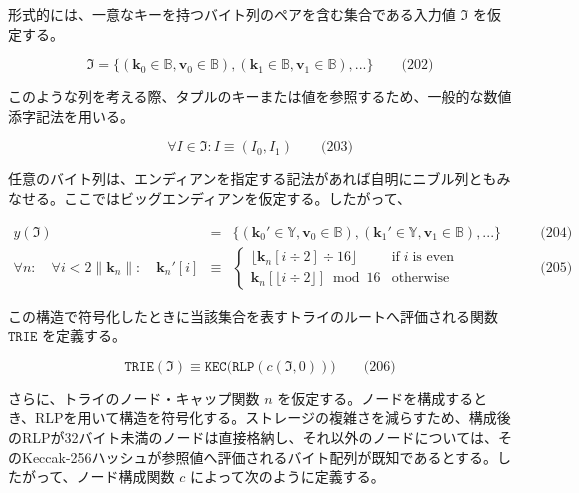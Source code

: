\documentclass[
]{ltjsarticle}
\begin{document}
形式的には、一意なキーを持つバイト列のペアを含む集合である入力値
\(\mathfrak{I}\) を仮定する。

\protect\hypertarget{eq-202}{}{}

\[\mathfrak{I} = \{ (\mathbf{k}_0 \in \mathbb{B}, \mathbf{v}_0 \in \mathbb{B}), (\mathbf{k}_1 \in \mathbb{B}, \mathbf{v}_1 \in \mathbb{B}), ... \} \qquad \text{(202)}\]

このような列を考える際、タプルのキーまたは値を参照するため、一般的な数値添字記法を用いる。

\protect\hypertarget{eq-203}{}{}

\[\forall I \in \mathfrak{I}: I \equiv (I_0, I_1) \qquad \text{(203)}\]

任意のバイト列は、エンディアンを指定する記法があれば自明にニブル列ともみなせる。ここではビッグエンディアンを仮定する。したがって、

\protect\hypertarget{eq-204}{}{}\protect\hypertarget{eq-205}{}{}

\[\begin{aligned}
y(\mathfrak{I}) & = & \{ (\mathbf{k}_0' \in \mathbb{Y}, \mathbf{v}_0 \in \mathbb{B}), (\mathbf{k}_1' \in \mathbb{Y}, \mathbf{v}_1 \in \mathbb{B}), ... \} & \qquad \text{(204)} \\
\forall n: \quad \forall i < 2\lVert\mathbf{k}_{n}\rVert: \quad \mathbf{k}_{n}'[i] & \equiv &
\begin{cases}
\lfloor \mathbf{k}_{n}[i \div 2] \div 16 \rfloor & \text{if} \; i \; \text{is even} \\
\mathbf{k}_{n}[\lfloor i \div 2 \rfloor] \bmod 16 & \text{otherwise}
\end{cases} & \qquad \text{(205)}
\end{aligned}\]

この構造で符号化したときに当該集合を表すトライのルートへ評価される関数
\(\texttt{TRIE}\) を定義する。

\protect\hypertarget{eq-206}{}{}

\[\texttt{TRIE}(\mathfrak{I}) \equiv \texttt{KEC}\big(\texttt{RLP} (c(\mathfrak{I}, 0))\big) \qquad \text{(206)}\]

さらに、トライのノード・キャップ関数 \(n\)
を仮定する。ノードを構成するとき、RLPを用いて構造を符号化する。ストレージの複雑さを減らすため、構成後のRLPが32バイト未満のノードは直接格納し、それ以外のノードについては、そのKeccak-256ハッシュが参照値へ評価されるバイト配列が既知であるとする。したがって、ノード構成関数
\(c\) によって次のように定義する。

\protect\hypertarget{eq-207}{}{}
\end{document}
